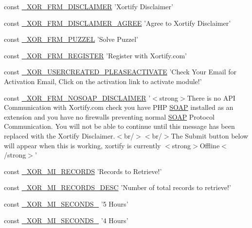 \begin{DoxyCompactItemize}
\item 
const \hyperlink{modinfo_8php_aa1dff11def4e2b8c8417b1514dccb087}{\-\_\-\-X\-O\-R\-\_\-\-F\-R\-M\-\_\-\-D\-I\-S\-C\-L\-A\-I\-M\-E\-R} 'Xortify Disclaimer'
\item 
const \hyperlink{modinfo_8php_a27d10109ee13581dcf8da8b82e730124}{\-\_\-\-X\-O\-R\-\_\-\-F\-R\-M\-\_\-\-D\-I\-S\-C\-L\-A\-I\-M\-E\-R\-\_\-\-A\-G\-R\-E\-E} 'Agree to Xortify Disclaimer'
\item 
const \hyperlink{modinfo_8php_ac083ec5b8a1e54fb36e4757c8f64b527}{\-\_\-\-X\-O\-R\-\_\-\-F\-R\-M\-\_\-\-P\-U\-Z\-Z\-E\-L} 'Solve Puzzel'
\item 
const \hyperlink{modinfo_8php_a9c85538866520c5aa93787af24aefcdb}{\-\_\-\-X\-O\-R\-\_\-\-F\-R\-M\-\_\-\-R\-E\-G\-I\-S\-T\-E\-R} 'Register with Xortify.\-com'
\item 
const \hyperlink{modinfo_8php_aa88aaa597939c6f9c48e42702e5f9703}{\-\_\-\-X\-O\-R\-\_\-\-U\-S\-E\-R\-C\-R\-E\-A\-T\-E\-D\-\_\-\-P\-L\-E\-A\-S\-E\-A\-C\-T\-I\-V\-A\-T\-E} 'Check Your Email for Activation Email, Click on the activation link to activate module!'
\item 
const \hyperlink{modinfo_8php_a4bd036c1fe4b9888fa44bc36168c0900}{\-\_\-\-X\-O\-R\-\_\-\-F\-R\-M\-\_\-\-N\-O\-S\-O\-A\-P\-\_\-\-D\-I\-S\-C\-L\-A\-I\-M\-E\-R} '$<$strong$>$There is no A\-P\-I Communication with Xortify.\-com check you have P\-H\-P \hyperlink{serverup_8php_abd77e417d95ee59b739e54a62fe97fbc}{S\-O\-A\-P} installed as an extension and you have no firewalls preventing normal \hyperlink{serverup_8php_abd77e417d95ee59b739e54a62fe97fbc}{S\-O\-A\-P} Protocol Communication. You will not be able to continue until this message has been replaced with the Xortify Disclaimer.$<$br/$>$$<$br/$>$The Submit button below will appear when this is working, xortify is currently $<$strong$>$Offline$<$/strong$>$'
\item 
const \hyperlink{modinfo_8php_a3aff86a5f10d9e1a1bfda77d4404aad6}{\-\_\-\-X\-O\-R\-\_\-\-M\-I\-\_\-\-R\-E\-C\-O\-R\-D\-S} 'Records to Retrieve!'
\item 
const \hyperlink{modinfo_8php_a339be6d2fe23ff9b00a837f916858eb3}{\-\_\-\-X\-O\-R\-\_\-\-M\-I\-\_\-\-R\-E\-C\-O\-R\-D\-S\-\_\-\-D\-E\-S\-C} 'Number of total records to retrieve!'
\item 
const \hyperlink{modinfo_8php_aee69ab7ded4ec47c6a5fcf212b8c11d7}{\-\_\-\-X\-O\-R\-\_\-\-M\-I\-\_\-\-S\-E\-C\-O\-N\-D\-S\-\_} '5 Hours'
\item 
const \hyperlink{modinfo_8php_a6fcaf92838ff41d6ce6ae16c14257c15}{\-\_\-\-X\-O\-R\-\_\-\-M\-I\-\_\-\-S\-E\-C\-O\-N\-D\-S\-\_} '4 Hours'
$$
\end{DoxyCompactItemize}
